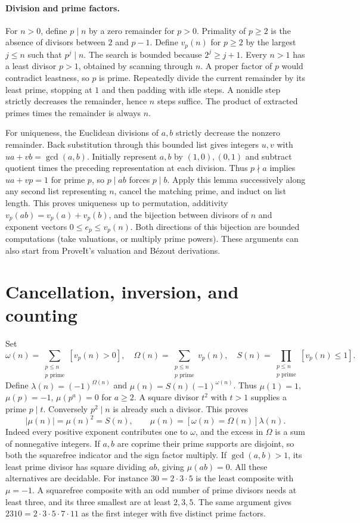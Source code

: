 \paragraph{Division and prime factors.}
For $n>0$, define $p\mid n$ by a zero remainder for $p>0$.
Primality of $p\ge2$ is the absence of divisors between $2$ and $p-1$.
Define $v_p(n)$ for $p\ge2$ by the largest $j\le n$ such that $p^j\mid n$.
The search is bounded because $2^j\ge j+1$. Every $n>1$ has a least
divisor $p>1$, obtained by scanning through $n$. A proper factor of
$p$ would contradict leastness, so $p$ is prime. Repeatedly divide the
current remainder by its least prime, stopping at $1$ and then padding
with idle steps. A nonidle step strictly decreases the remainder, hence
$n$ steps suffice. The product of extracted primes times the remainder
is always $n$.

For uniqueness, the Euclidean divisions of $a,b$ strictly decrease the
nonzero remainder. Back substitution through this bounded list gives
integers $u,v$ with $ua+vb=\gcd(a,b)$. Initially represent $a,b$ by
$(1,0),(0,1)$ and subtract quotient times the preceding representation
at each division. Thus $p\nmid a$ implies $ua+vp=1$ for prime $p$, so
$p\mid ab$ forces $p\mid b$. Apply this lemma successively along any
second list representing $n$, cancel the matching prime, and induct
on list length. This proves uniqueness up to permutation, additivity
$v_p(ab)=v_p(a)+v_p(b)$, and the bijection between divisors of $n$
and exponent vectors $0\le e_p\le v_p(n)$. Both directions of this
bijection are bounded computations (take valuations, or multiply prime
powers). These arguments can also start from ProveIt's valuation and
Bézout derivations.

\section{Cancellation, inversion, and counting}\label{sec:core}
Set
\[
 \omega(n)=\sum_{\substack{p\le n\\p\text{ prime}}}[v_p(n)>0],\quad
 \Omega(n)=\sum_{\substack{p\le n\\p\text{ prime}}}v_p(n),\quad
 S(n)=\prod_{\substack{p\le n\\p\text{ prime}}}[v_p(n)\le1].
\]
Define $\lambda(n)=(-1)^{\Omega(n)}$ and $\mu(n)=S(n)(-1)^{\omega(n)}$.
Thus $\mu(1)=1$, $\mu(p)=-1$, $\mu(p^a)=0$ for $a\ge2$.
A square divisor $t^2$ with $t>1$ supplies a prime $p\mid t$. Conversely
$p^2\mid n$ is already such a divisor. This proves
\[
 |\mu(n)|=\mu(n)^2=S(n),\qquad
 \mu(n)=[\omega(n)=\Omega(n)]\lambda(n).
\]
Indeed every positive exponent contributes one to $\omega$, and the
excess in $\Omega$ is a sum of nonnegative integers. If $a,b$ are
coprime their prime supports are disjoint, so both the squarefree
indicator and the sign factor multiply. If $\gcd(a,b)>1$, its least
prime divisor has square dividing $ab$, giving $\mu(ab)=0$.
All these alternatives are decidable. For instance $30=2\cdot3\cdot5$
is the least composite with $\mu=-1$. A squarefree composite with an odd
number of prime divisors needs at least three, and its three smallest
are at least $2,3,5$. The same argument gives $2310=2\cdot3\cdot5\cdot7\cdot11$
as the first integer with five distinct prime factors.

